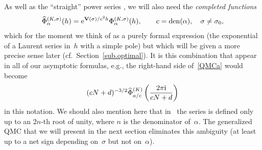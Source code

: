\documentclass[pdftex]{sigma}
\numberwithin{equation}{section}
\def\Phih{\widehat\Phi}
\def\a{\alpha}
\def\a{\alpha}
\def\s{\sigma}
\def\den{\mathrm{den}}
\def\V{\mathbf V}
\def\be{\begin{equation}}
\def\ee{\end{equation}}
\begin{document}
As well as the ``straight'' power series \smash{$\Phi^{(K,\s)}_\a(h)$}, we will also
need the \emph{completed functions}
\be
\label{DefPhih}
\Phih^{(K,\s)}_\a(h) = {\rm e}^{\V(\s)/c^2h} \Phi^{(K,\s)}_\a(h),
\qquad c=\den(\a),\quad \s\ne\s_0 ,
\ee
which for the moment we think of as a purely formal expression (the
exponential of a Laurent series in~$h$ with a simple pole) but which will
be given a more precise sense later (cf.\ Section~\ref{sub.optimal}). It
is this combination that appear in all of our asymptotic formulas, e.g., the
right-hand side of~\eqref{QMCa} would become
\[
(cN+d)^{-3/2} \Phih_{a/c}^{(K)}\left(\frac{2\pi {\rm i}}{cN+d}\right)
\]
in this
notation. We should also mention here that in~\cite{DG2} the series
\smash{$\Phi_\a^{(K,\s)}(h)$} is defined only up to an $2n$-th root of unity, where
$n$ is the denominator of~$\a$. The generalized QMC that we will present in
the next section eliminates this ambiguity (at least up to a net sign depending
on~$\s$ but not on~$\a$).
\end{document}
